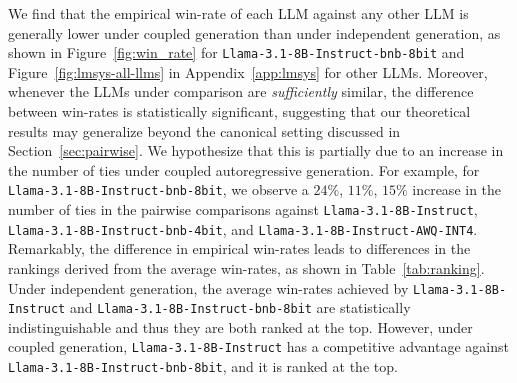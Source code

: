 %
We find that the empirical win-rate of each LLM against any other LLM is generally lower under coupled generation than under independent generation, as shown in Figure~\ref{fig:win_rate} for \texttt{Llama-3.1-8B-Instruct-bnb-8bit} and Figure~\ref{fig:lmsys-all-llms} in Appendix~\ref{app:lmsys} for other LLMs.
% 
Moreover, whenever the LLMs under comparison are \textit{sufficiently} similar, the difference between win-rates is statistically significant, suggesting that our theoretical results may generalize beyond the canonical setting discussed in Section~\ref{sec:pairwise}.
%
%
%
We hypothesize that this is partially due to an increase in the number of ties under coupled autoregressive generation. For example, for \texttt{Llama-3.1-8B-Instruct-bnb-8bit}, we observe a $24\%$, $11\%$, $15\%$ increase in the number of ties in the pairwise comparisons against \texttt{Llama-3.1-8B-Instruct}, \texttt{Llama-3.1-8B-Instruct-bnb-4bit}, and \texttt{Llama-3.1-8B-Instruct-AWQ-INT4}. 
%
Remarkably, the difference in empirical win-rates 
%  
leads to differences in the rankings derived from the average win-rates, as shown in Table~\ref{tab:ranking}. 
%
Under independent generation, the average win-rates achieved by \texttt{Llama-3.1-8B-Instruct} and \texttt{Llama-3.1-8B-Instruct-bnb-8bit} are statistically indistinguishable and thus they are both ranked at the top.
%
However, under coupled generation, \texttt{Llama-3.1-8B-Instruct} has a competitive advantage against \texttt{Llama-3.1-8B-Instruct-bnb-8bit}, and it is ranked at the top.
% 




